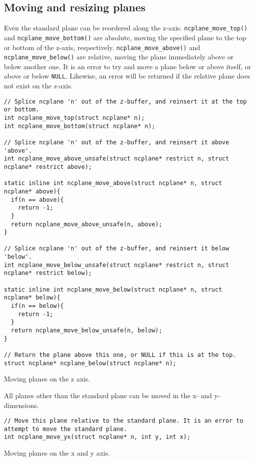 \subsection{Moving and resizing planes}
Even the standard plane can be reordered along the z-axis. \texttt{ncplane\_move\_top()}
and \texttt{ncplane\_move\_bottom()} are absolute, moving the specified plane
to the top or bottom of the z-axis, respectively. \texttt{ncplane\_move\_above()}
and \texttt{ncplane\_move\_below()} are relative, moving the plane immediately
above or below another one. It is an error to try and move a plane below or above itself,
or above or below \texttt{NULL}. Likewise, an error will be returned if the relative
plane does not exist on the z-axis.
\begin{listing}[!htb]
\begin{verbatim}
// Splice ncplane 'n' out of the z-buffer, and reinsert it at the top or bottom.
int ncplane_move_top(struct ncplane* n);
int ncplane_move_bottom(struct ncplane* n);

// Splice ncplane 'n' out of the z-buffer, and reinsert it above 'above'.
int ncplane_move_above_unsafe(struct ncplane* restrict n, struct ncplane* restrict above);

static inline int ncplane_move_above(struct ncplane* n, struct ncplane* above){
  if(n == above){
    return -1;
  }
  return ncplane_move_above_unsafe(n, above);
}

// Splice ncplane 'n' out of the z-buffer, and reinsert it below 'below'.
int ncplane_move_below_unsafe(struct ncplane* restrict n, struct ncplane* restrict below);

static inline int ncplane_move_below(struct ncplane* n, struct ncplane* below){
  if(n == below){
    return -1;
  }
  return ncplane_move_below_unsafe(n, below);
}

// Return the plane above this one, or NULL if this is at the top.
struct ncplane* ncplane_below(struct ncplane* n);
\end{verbatim}
\caption{Moving planes on the z axis.}
\end{listing}

All planes other than the standard plane can be moved in the x- and y-dimensions.
\begin{listing}[!htb]
\begin{verbatim}
// Move this plane relative to the standard plane. It is an error to attempt to move the standard plane.
int ncplane_move_yx(struct ncplane* n, int y, int x);
\end{verbatim}
\caption{Moving planes on the x and y axis.}
\end{listing}

